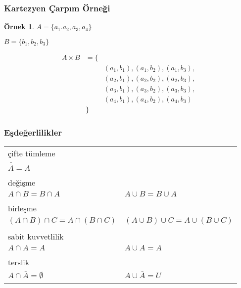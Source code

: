 \documentclass[dvipsnames]{beamer}
\theoremstyle{definition}
\theoremstyle{example}
\newtheorem{ornek}[theorem]{Örnek}
\theoremstyle{plain}
\begin{document}
\begin{frame}
  \frametitle{Kartezyen Çarpım Örneği}

  \begin{ornek}
    $A = \{a_1.a_2,a_3,a_4\}$

    $B = \{b_1,b_2,b_3\}$

    \medskip
    \begin{eqnarray*}
      A \times B & = \{ & \\
                 &      & (a_1,b_1),(a_1,b_2),(a_1,b_3),\\
                 &      & (a_2,b_1),(a_2,b_2),(a_2,b_3),\\
                 &      & (a_3,b_1),(a_3,b_2),(a_3,b_3),\\
                 &      & (a_4,b_1),(a_4,b_2),(a_4,b_3)\\
                 &  \}  &
    \end{eqnarray*}
  \end{ornek}
\end{frame}

\begin{frame}
  \frametitle{Eşdeğerlilikler}

  \begin{tabular}{ll}
    \alert{çifte tümleme} &\\
      $\overline{\overline{A}} = A$\\\\
    \pause
    \alert{değişme} &\\
      $A \cap B = B \cap A$ &
      $A \cup B = B \cup A$\\\\
    \pause
    \alert{birleşme} &\\
      $(A \cap B) \cap C = A \cap (B \cap C)$ &
      $(A \cup B) \cup C = A \cup (B \cup C)$\\\\
    \pause
    \alert{sabit kuvvetlilik} &\\
      $A \cap A = A$ &
      $A \cup A = A$\\\\
    \pause
    \alert{terslik} &\\
      $A \cap \overline{A} = \emptyset$ &
      $A \cup \overline{A} = U$\\\\
  \end{tabular}
\end{frame}
\end{document}
